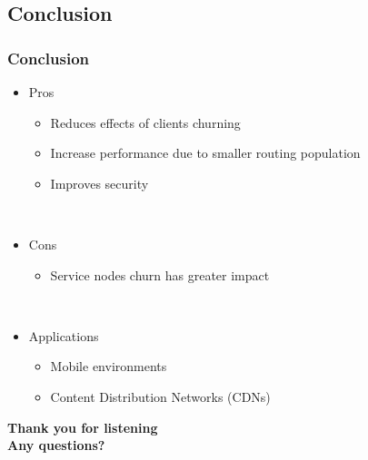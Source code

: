 \documentclass[xcolor=pdftex,dvipsnames,table]{beamer}
\begin{document}
\subsection{Conclusion}
\begin{frame}
    \frametitle{Conclusion}


    \begin{itemize}
        \item{Pros}
        \begin{itemize}
            \item{Reduces effects of clients churning}
            \item{Increase performance due to smaller routing population}
            \item{Improves security}
        \end{itemize}
        ~\\
        \item{Cons}
        \begin{itemize}
            \item{Service nodes churn has greater impact}
        \end{itemize}
        ~\\
        \item{Applications}
        \begin{itemize}
            \item{Mobile environments}
            \item{Content Distribution Networks (CDNs)}
        \end{itemize}
    \end{itemize}


\end{frame}

\begin{frame}
  \begin{center}
    \textbf{Thank you for listening\\
    Any questions?\\}
    \titlepage
  \end{center}
\end{frame}
\end{document}
